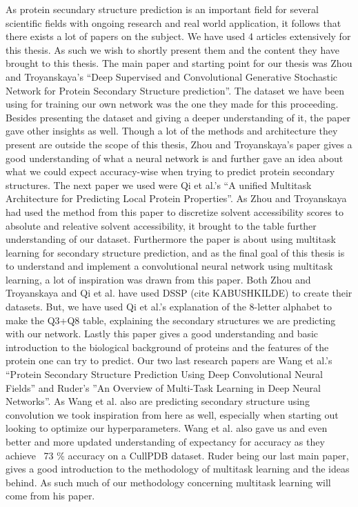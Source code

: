 As protein secundary structure prediction is an important field for several scientific fields with ongoing research and real world application, it follows that there exists a lot of papers on the subject. We have used 4 articles extensively for this thesis. As such we wish to shortly present them and the content they have brought to this thesis. 
The main paper and starting point for our thesis was Zhou and Troyanskaya’s “Deep Supervised and Convolutional Generative Stochastic Network for Protein Secondary Structure prediction”. The dataset we have been using for training our own network was the one they made for this proceeding. Besides presenting the dataset and giving a deeper understanding of it, the paper gave other insights as well. Though a lot of the methods and architecture they present are outside the scope of this thesis, Zhou and Troyanskaya’s paper gives a good understanding of what a neural network is and further gave an idea about what we could expect accuracy-wise when trying to predict protein secondary structures. 
The next paper we used were Qi et al.’s “A unified Multitask Architecture for Predicting Local Protein Properties”. As Zhou and Troyanskaya had used the method from this paper to discretize solvent accessibility scores to absolute and releative solvent accessibility, it brought to the table further understanding of our dataset. Furthermore the paper is about using multitask learning for secondary structure prediction, and as the final goal of this thesis is to understand and implement a convolutional neural network using multitask learning, a lot of inspiration was drawn from this paper. Both Zhou and Troyanskaya and Qi et al. have used DSSP (cite KABUSHKILDE) to create their datasets. But, we have used Qi et al.’s explanation of the 8-letter alphabet to make the Q3+Q8 table, explaining the secondary structures we are predicting with our network. Lastly this paper gives a good understanding and basic introduction to the biological background of proteins and the features of the protein one can try to predict. 
Our two last research papers are Wang et al.’s “Protein Secondary Structure Prediction Using Deep Convolutional Neural Fields” and Ruder’s ”An Overview of Multi-Task Learning in Deep Neural Networks”.  As Wang et al. also are predicting secondary structure using convolution we took inspiration from here as well, especially when starting out looking to optimize our hyperparameters. Wang et al. also gave us and even better and more updated understanding of expectancy for accuracy as they achieve ~73 \% accuracy on a CullPDB dataset. Ruder being our last main paper, gives a good introduction to the methodology of multitask learning and the ideas behind. As such much of our methodology concerning multitask learning will come from his paper.











